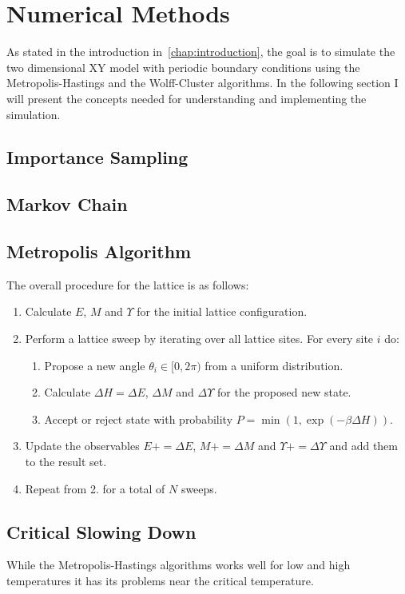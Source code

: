 \section{Numerical Methods}\label{sec:theo:numerical_methods}
	As stated in the introduction in~\cref{chap:introduction}, the goal is to simulate the two dimensional XY model with periodic boundary conditions using the Metropolis-Hastings and the Wolff-Cluster algorithms. In the following section I will present the concepts needed for understanding and implementing the simulation.
	
	\subsection{Importance Sampling}
		
%		
	\subsection{Markov Chain}

	\subsection{Metropolis Algorithm}
	
	
		The overall procedure for the lattice is as follows:
		\begin{enumerate}
			\item Calculate $E$, $M$ and $\Upsilon$ for the initial lattice configuration.
			\item Perform a lattice sweep by iterating over all lattice sites. For every site $i$ do:
			\begin{enumerate}
				\item Propose a new angle $\theta_i \in [0,2\pi)$ from a uniform distribution.
				\item Calculate $\Delta H = \Delta E$, $\Delta M$ and $\Delta \Upsilon$ for the proposed new state.
				\item Accept or reject state with probability $P = \min{(1, \exp{(-\beta\Delta H)})}$.
			\end{enumerate}
			\item Update the observables $E \mathrel{{+}{=}} \Delta E$, $M \mathrel{{+}{=}} \Delta M$ and $\Upsilon \mathrel{{+}{=}} \Delta \Upsilon$ and add them to the result set.
			\item Repeat from 2. for a total of $N$ sweeps.
		\end{enumerate}
		
	\subsection{Critical Slowing Down}\label{sec:theo:critical_slowing_down}
		While the Metropolis-Hastings algorithms works well for low and high temperatures it has its problems near the critical temperature. 
		
